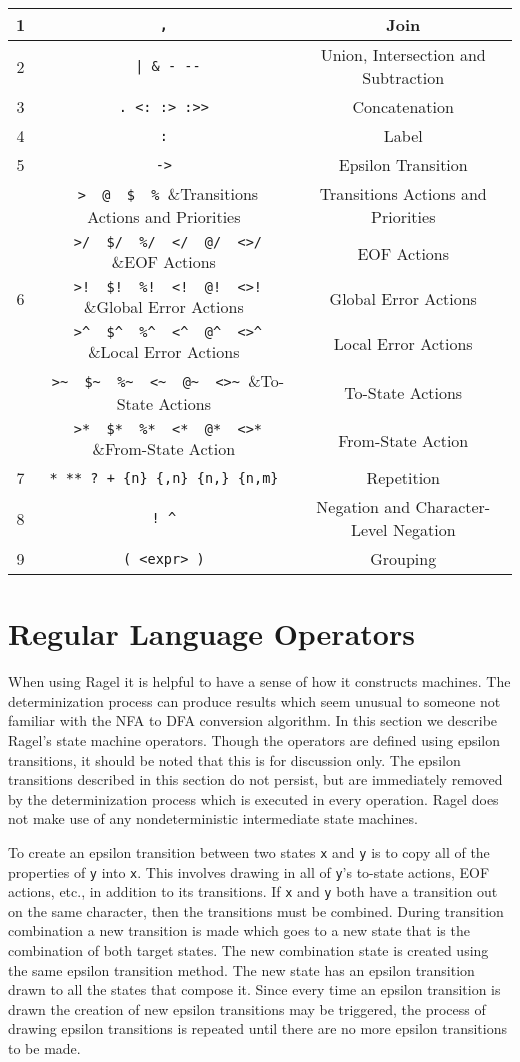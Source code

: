 \documentclass[letterpaper,11pt,oneside]{book}
\newcommand{\verbspace}{\vspace{10pt}}
\begin{document}
\verbspace
\begin{tabular}{|c|c|c|}
\hline
1&\verb| , |&Join\\
\hline
2&\verb/ | & - --/&Union, Intersection and Subtraction\\
\hline
3&\verb| . <: :> :>> |&Concatenation\\
\hline
4&\verb| : |&Label\\
\hline
5&\verb| -> |&Epsilon Transition\\
\hline
&\verb| >  @  $  % |&Transitions Actions and Priorities\\
\cline{2-3}
&\verb| >/  $/  %/  </  @/  <>/ |&EOF Actions\\
\cline{2-3}
6&\verb| >!  $!  %!  <!  @!  <>! |&Global Error Actions\\
\cline{2-3}
&\verb| >^  $^  %^  <^  @^  <>^ |&Local Error Actions\\
\cline{2-3}
&\verb| >~  $~  %~  <~  @~  <>~ |&To-State Actions\\
\cline{2-3}
&\verb| >*  $*  %*  <*  @*  <>* |&From-State Action\\
\hline
7&\verb| * ** ? + {n} {,n} {n,} {n,m} |&Repetition\\
\hline
8&\verb| ! ^ |&Negation and Character-Level Negation\\
\hline
9&\verb| ( <expr> ) |&Grouping\\
\hline
\end{tabular}

\section{Regular Language Operators}
\label{machconst}

When using Ragel it is helpful to have a sense of how it constructs machines.
The determinization process can produce results which seem unusual to someone
not familiar with the NFA to DFA conversion algorithm. In this section we
describe Ragel's state machine operators. Though the operators are defined
using epsilon transitions, it should be noted that this is for discussion only.
The epsilon transitions described in this section do not persist, but are
immediately removed by the determinization process which is executed in every
operation. Ragel does not make use of any nondeterministic intermediate state
machines. 

To create an epsilon transition between two states \verb|x| and \verb|y| is to
copy all of the properties of \verb|y| into \verb|x|. This involves drawing in
all of \verb|y|'s to-state actions, EOF actions, etc., in addition to its
transitions. If \verb|x| and \verb|y| both have a transition out on the same
character, then the transitions must be combined.  During transition
combination a new transition is made which goes to a new state that is the
combination of both target states. The new combination state is created using
the same epsilon transition method.  The new state has an epsilon transition
drawn to all the states that compose it. Since every time an epsilon transition
is drawn the creation of new epsilon transitions may be triggered, the process
of drawing epsilon transitions is repeated until there are no more epsilon
transitions to be made.
\end{document}
